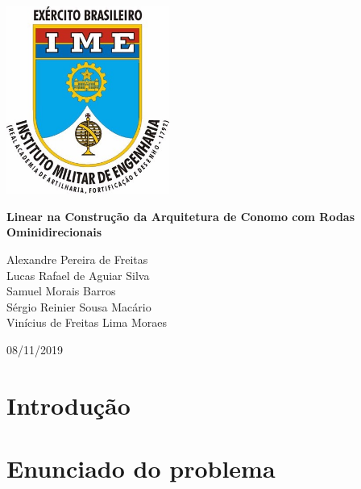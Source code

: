 \documentclass{article}
\begin{document}
\begin{titlepage}
    \begin{center}

        \includegraphics[width=0.4\textwidth]{ime.jpg}

        \vspace{1cm}

        \Huge
        \textbf{Linear na Construção da Arquitetura de Conomo com Rodas Ominidirecionais}
 
        \vspace{0.5cm}
        \LARGE
 
        \vspace{1.5cm}
 
        Alexandre Pereira de Freitas\\
        Lucas Rafael de Aguiar Silva\\
        Samuel Morais Barros\\
        Sérgio Reinier Sousa Macário\\
        Vinícius de Freitas Lima Moraes\\
 
        \vfill
 
        \vspace{0.8cm}
 
        \Large
        08/11/2019
 
    \end{center}
\end{titlepage}

\tableofcontents
\newpage

\section{Introdução}

\section{Enunciado do problema}
\end{document}
